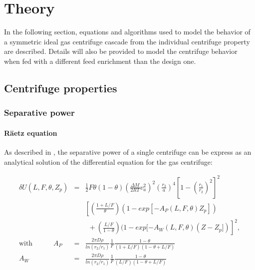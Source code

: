 \section{Theory}

In the following section, equations and algorithms used to model the behavior of
a symmetric ideal gas centrifuge cascade from the individual centrifuge property
are described. Details will also be provided to model the centrifuge behavior
when fed with a different feed enrichment than the design one.

\subsection{Centrifuge properties}

\subsubsection{Separative power}

\paragraph{R\"aetz equation}

As described in \cite{glaser.2008}, the separative power of a single centrifuge
can be express as an analytical solution \cite{raetz.phd} of the
differential equation for the gas centrifuge:

\begin{eqnarray}
    \label{eq:raetz}
    \delta U(L,F,\theta,Z_{p}) &= &\frac{1}{2}
            F\theta(1 - \theta)
            \left(\frac{\Delta M}{2 RT}v_{a}^{2}\right)^{2}
            \left(\frac{r_{2}}{a}\right)^{4}
            \left[1 - \left(\frac{r_{1}}{r_{2}}\right)^{2}\right]^{2}
            \label{eq_raetz}\\
        &&
            \left[
                \left(\frac{1+L/F}{\theta}\right)
                (1- exp[ - A_{P}(L,F,\theta)Z_{p}])  \nonumber  \right. \\
        &&~~ + \left.\left(\frac{L/F}{1 - \theta}\right)
                (1 - exp[ -A_{W}(L,F,\theta)(Z - Z_{p}])\right]^{2}, \nonumber
                \\
    \textrm{with~ ~ ~ ~ ~}
        A_{P} &= &\frac{2\pi D\rho }{ ln(r_{2}/r_{1}) }
                 \frac{ 1 }{ F }
                 \frac{ 1-\theta }{(1+L/F)(1-\theta+L/F) }\\
        A_{W} &= &\frac{2\pi D\rho }{ ln(r_{2}/r_{1}) }
                 \frac{ 1 }{ F }
                 \frac{ 1-\theta }{ (L/F)(1-\theta+L/F) }
\end{eqnarray}

